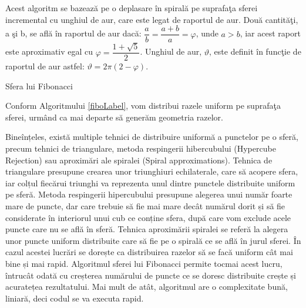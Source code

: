 	Acest algoritm se bazeaz\u{a} pe o deplasare \^{i}n spiral\u{a} pe suprafa\c{t}a sferei incremental cu unghiul de aur, care este legat de raportul de aur. Dou\u{a} cantit\u{a}\c{t}i, a \c{s}i b, se afl\u{a} \^{i}n raportul de aur dac\u{a}: $\dfrac{a}{b} = \dfrac{a+b}{a} = \varphi$, unde $a>b$, iar acest raport este aproximativ egal cu $\varphi = \dfrac{1+\sqrt{5}}{2}$. Unghiul de aur, $\vartheta$, este definit \^{i}n func\c{t}ie de raportul de aur astfel: $\vartheta = 2\pi(2- \varphi)$. 
	 
	
	\begin{algorithm}
		\caption{Sfera lui Fibonacci}
		\label{fiboLabel}
	\begin{algorithmic}[1]	
		\EndFor
		\EndProcedure
	\end{algorithmic}
	\end{algorithm}

	Conform Algoritmului \ref{fiboLabel}, vom distribui razele uniform pe suprafa\c{t}a sferei, urm\^{a}nd ca mai departe s\u{a} gener\u{a}m geometria razelor. 
	
	Bineînțeles, există multiple tehnici de distribuire uniformă a punctelor pe o sferă, precum tehnici de triangulare, metoda respingerii hibercubului (Hypercube Rejection) sau aproximări ale spiralei (Spiral approximations). Tehnica de triangulare presupune crearea unor triunghiuri echilaterale, care să acopere sfera, iar colțul fiecărui triunghi va reprezenta unul dintre punctele distribuite uniform pe sferă. Metoda respingerii hipercubului presupune alegerea unui număr foarte mare de puncte, dar care trebuie să fie mai mare decât numărul dorit și să fie considerate în interiorul unui cub ce conține sfera, după care vom exclude acele puncte care nu se află în sferă. Tehnica aproximării spiralei se referă la alegera unor puncte uniform distribuite care să fie pe o spirală ce se află în jurul sferei. În cazul acestei lucrări se dorește ca distribuirea razelor să se facă uniform cât mai bine și mai rapid. Algoritmul sferei lui Fibonacci permite tocmai acest lucru, întrucât odată cu creșterea numărului de puncte ce se doresc distribuite crește și acuratețea rezultatului. Mai mult de atât, algoritmul are o complexitate bună, liniară, deci codul se va executa rapid.
		
